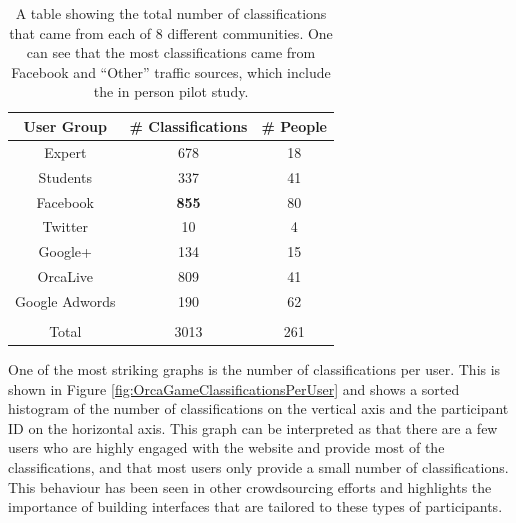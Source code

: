 \documentclass[12pt,oneside]{book}
\begin{document}
\begin{table}
\begin{tabular}{|c|c|c|}
\hline
User Group      &   \# Classifications & \# People \\
\hline                                             
Expert          &   678                & 18        \\
Students        &   337                & 41        \\
Facebook        &   \textbf{855}       & 80        \\
Twitter         &   10                 & 4         \\
Google+         &   134                & 15        \\
OrcaLive        &   809                & 41        \\
Google Adwords  &   190                & 62        \\
\hline                                 &           \\
Total             &	3013               & 261       \\
\hline
\end{tabular}
\caption{A table showing the total number of classifications that came
  from each of 8 different communities.  One can see that the most
  classifications came from Facebook and ``Other'' traffic sources,
  which include the in person pilot study.}
\label{table:OrcaGameTotalNum}
\end{table}

One of the most striking graphs is the number of classifications per
user. This is shown in Figure
\ref{fig:OrcaGameClassificationsPerUser} and shows a sorted histogram
of the number of classifications on the vertical axis and the
participant ID on the horizontal axis.  This graph can be interpreted
as that there are a few users who are highly engaged with the website
and provide most of the classifications, and that most users only
provide a small number of classifications.  This behaviour has been
seen in other crowdsourcing efforts and highlights the importance of
building interfaces that are tailored to these types of participants.
	
\end{document}
